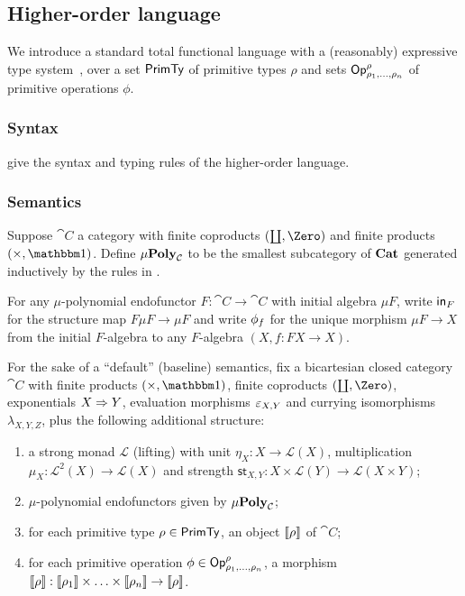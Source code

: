 \subsection{Higher-order language}

We introduce a standard total functional language with a (reasonably) expressive type
system~\cite{crole94,pitts01,santocanale02}, over a set $\mathsf{PrimTy}$ of primitive types $\rho$ and sets
$\mathsf{Op}^\rho_{\rho_1,\ldots,\rho_n}$ of primitive operations $\phi$.

\subsubsection{Syntax}
\label{sec:language:syntax}




 give the syntax and typing rules of the higher-order language.

\subsubsection{Semantics}
\label{sec:language:semantics}




\begin{definition}[$\mu$-polynomial]
Suppose $\cat{C}$ a category with finite coproducts $(\coprod, \Zero)$ and finite products $(\times, \One)$.
Define $\mu\mathbf{Poly}_{\mathcal{C}}$ to be the smallest subcategory of $\mathbf{Cat}$ generated inductively by the rules in
.
\end{definition}

For any $\mu$-polynomial endofunctor $F: \cat{C} \to \cat{C}$ with initial algebra $\mu F$, write $\mathsf{in}_F$
for the structure map $F\mu F \to \mu F$ and write $\phi_f$ for the unique morphism $\mu F \to X$ from the
initial $F$-algebra to any $F$-algebra $(X, f: FX \to X)$.

For the sake of a ``default'' (baseline) semantics, fix a bicartesian closed category $\cat{C}$ with finite
products $(\times, \One)$, finite coproducts $(\coprod, \Zero)$, exponentials $X \Rightarrow Y$, evaluation
morphisms $\varepsilon_{X,Y}$ and currying isomorphisms $\lambda_{X,Y,Z}$, plus the following additional structure:
\begin{enumerate}
\item a strong monad $\mathcal{L}$ (lifting) with unit $\eta_X: X \to \mathcal{L}(X)$, multiplication $\mu_X:
\mathcal{L}^2(X) \to \mathcal{L}(X)$ and strength $\mathsf{st}_{X,Y}: X \times \mathcal{L}(Y) \to
\mathcal{L}(X \times Y)$;
\item $\mu$-polynomial endofunctors given by $\mu\mathbf{Poly}_{\mathcal{C}}$;
\item for each primitive type $\rho \in \mathsf{PrimTy}$, an object $\llbracket \rho \rrbracket$ of $\cat{C}$;
\item for each primitive operation $\phi \in \mathsf{Op}^\rho_{\rho_1,\ldots,\rho_n}$, a morphism $\llbracket \rho \rrbracket:
\llbracket \rho_1 \rrbracket \times \ldots \times \llbracket \rho_n \rrbracket \to \llbracket \rho \rrbracket$.
\end{enumerate}

